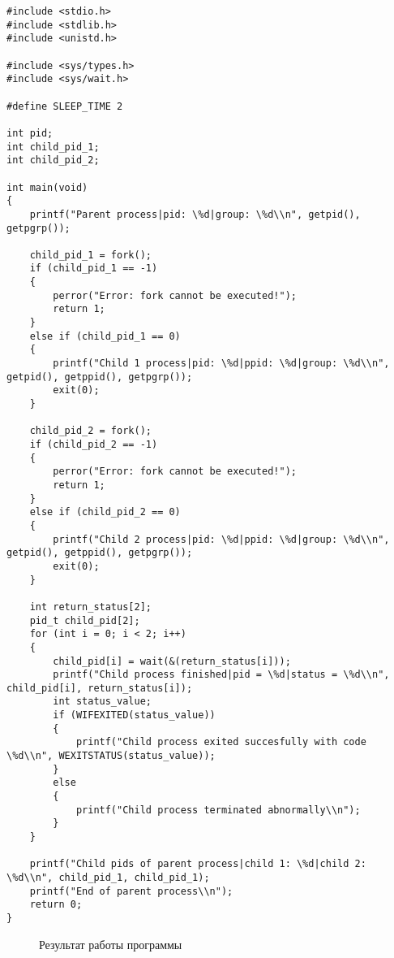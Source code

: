 \begin{lstlisting}[label=task_2,caption=Код к заданию №2]
#include <stdio.h>
#include <stdlib.h>
#include <unistd.h>

#include <sys/types.h>
#include <sys/wait.h>

#define SLEEP_TIME 2

int pid;
int child_pid_1;
int child_pid_2;

int main(void)
{
    printf("Parent process|pid: \%d|group: \%d\\n", getpid(), getpgrp());

    child_pid_1 = fork();
    if (child_pid_1 == -1)
    {
        perror("Error: fork cannot be executed!");
        return 1;
    }
    else if (child_pid_1 == 0)
    {
        printf("Child 1 process|pid: \%d|ppid: \%d|group: \%d\\n", getpid(), getppid(), getpgrp());
        exit(0);
    }

    child_pid_2 = fork();
    if (child_pid_2 == -1)
    {
        perror("Error: fork cannot be executed!");
        return 1;
    }
    else if (child_pid_2 == 0)
    {
        printf("Child 2 process|pid: \%d|ppid: \%d|group: \%d\\n", getpid(), getppid(), getpgrp());
        exit(0);
    }

    int return_status[2];
    pid_t child_pid[2];
    for (int i = 0; i < 2; i++)
    {
        child_pid[i] = wait(&(return_status[i]));
        printf("Child process finished|pid = \%d|status = \%d\\n", child_pid[i], return_status[i]);
        int status_value;
        if (WIFEXITED(status_value))
        {
            printf("Child process exited succesfully with code \%d\\n", WEXITSTATUS(status_value));
        }
        else
        {
            printf("Child process terminated abnormally\\n");
        }
    }
   
    printf("Child pids of parent process|child 1: \%d|child 2: \%d\\n", child_pid_1, child_pid_1);
    printf("End of parent process\\n");
    return 0;
}
\end{lstlisting}

\begin{figure}[ph!]
	\caption{Результат работы программы}
\end{figure}

